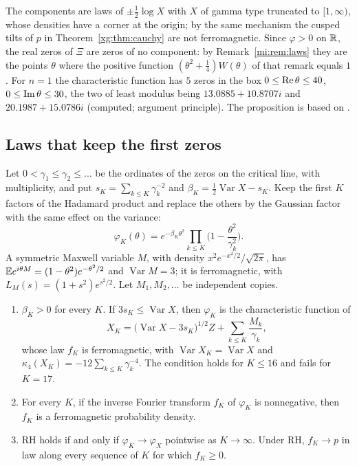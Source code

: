 The components are laws of $\pm\tfrac12\log X$ with $X$ of gamma type truncated to $[1,\infty)$, whose densities have a corner at the origin; by the same mechanism the cusped tilts of $p$ in Theorem~\ref{xg:thm:cauchy} are not ferromagnetic. Since $\varphi>0$ on $\mathbb{R}$, the real zeros of $\Xi$ are zeros of no component: by Remark~\ref{mi:rem:laws} they are the points $\theta$ where the positive function $(\theta^2+\frac14)W(\theta)$ of that remark equals $1$. For $n=1$ the characteristic function has $5$ zeros in the box $0\le\operatorname{Re}\theta\le40$, $0\le\operatorname{Im}\theta\le30$, the two of least modulus being $13.0885+10.8707i$ and $20.1987+15.0786i$ (computed; argument principle). The proposition is based on \cite{P26pole}.

\subsection{Laws that keep the first zeros}\label{fm:sec:zerocompleted}

Let $0<\gamma_1\le\gamma_2\le\dots$ be the ordinates of the zeros on the critical line, with multiplicity, and put $s_K=\sum_{k\le K}\gamma_k^{-2}$ and $\beta_K=\frac12\operatorname{Var}X-s_K$. Keep the first $K$ factors of the Hadamard product and replace the others by the Gaussian factor with the same effect on the variance:
\[
\varphi_K(\theta)=e^{-\beta_K\theta^2}\prod_{k\le K}\Big(1-\frac{\theta^2}{\gamma_k^2}\Big).
\]
A symmetric Maxwell variable $M$, with density $x^2e^{-x^2/2}/\sqrt{2\pi}$, has $\mathbb{E} e^{i\theta M}=(1-\theta^2)e^{-\theta^2/2}$ and $\operatorname{Var}M=3$; it is ferromagnetic, with $L_M(s)=(1+s^2)e^{s^2/2}$. Let $M_1,M_2,\dots$ be independent copies.

\begin{theorem}\label{fm:thm:zc}
\begin{enumerate}
\item[(i)] $\beta_K>0$ for every $K$. If $3s_K\le\operatorname{Var}X$, then $\varphi_K$ is the characteristic function of
\[
X_K=\big(\operatorname{Var}X-3s_K\big)^{1/2}Z+\sum_{k\le K}\frac{M_k}{\gamma_k},
\]
whose law $f_K$ is ferromagnetic, with $\operatorname{Var}X_K=\operatorname{Var}X$ and $\kappa_4(X_K)=-12\sum_{k\le K}\gamma_k^{-4}$. The condition holds for $K\le16$ and fails for $K=17$.
\item[(ii)] For every $K$, if the inverse Fourier transform $f_K$ of $\varphi_K$ is nonnegative, then $f_K$ is a ferromagnetic probability density.
\item[(iii)] RH holds if and only if $\varphi_K\to\varphi_X$ pointwise as $K\to\infty$. Under RH, $f_K\to p$ in law along every sequence of $K$ for which $f_K\ge0$.
\end{enumerate}
\end{theorem}

